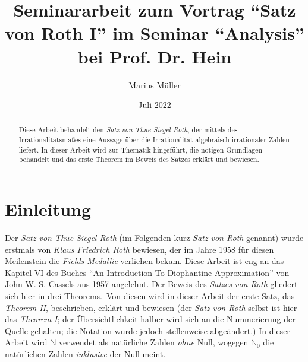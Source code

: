 \documentclass[11pt]{article}
\title{Seminararbeit zum Vortrag ``Satz von Roth I'' im Seminar ``Analysis'' bei Prof. Dr. Hein}
\author{Marius Müller}
\date{Juli 2022}
\begin{document}
    \maketitle

    \vfill

    \begin{abstract}
        \textrm{Diese Arbeit behandelt den \emph{Satz von Thue-Siegel-Roth}, der mittels des Irrationalitätsmaßes eine
        Aussage über die Irrationalität algebraisch irrationaler Zahlen liefert.
        \newline
        In dieser Arbeit wird zur Thematik hingeführt, die nötigen Grundlagen behandelt und das erste Theorem im Beweis
        des Satzes erklärt und bewiesen.}
    \end{abstract}

    \newpage

    \tableofcontents

    \newpage

    \section{Einleitung}
    \label{sec:intro}
        \textrm{Der \emph{Satz von Thue-Siegel-Roth} (im Folgenden kurz \emph{Satz von Roth} genannt) wurde erstmals von
        \emph{Klaus Friedrich Roth} bewiesen, der im Jahre 1958 für diesen Meilenstein die \emph{Fields-Medallie}
        verliehen bekam.
        \newline
        Diese Arbeit ist eng an das Kapitel VI des Buches ``An Introduction To Diophantine Approximation'' von
        John W. S. Cassels aus 1957 angelehnt.
        \newline
        Der Beweis des \emph{Satzes von Roth} gliedert sich hier in drei Theorems.\ Von diesen wird in dieser
        Arbeit der erste Satz, das \emph{Theorem II}, beschrieben, erklärt und bewiesen (der \emph{Satz von Roth} selbst
        ist hier das \emph{Theorem I}; der Übersichtlichkeit halber wird sich an die Nummerierung der Quelle gehalten;
        die Notation wurde jedoch stellenweise abgeändert.)
        \newline
        In dieser Arbeit wird $\mathbb{N}$ verwendet als natürliche Zahlen \emph{ohne} Null, wogegen $\mathbb{N}_0$ die
        natürlichen Zahlen \emph{inklusive} der Null meint.}

    
    
    

    
        
\end{document}
